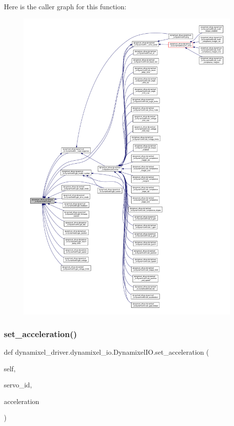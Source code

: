 Here is the caller graph for this function\+:
\nopagebreak
\begin{figure}[H]
\begin{center}
\leavevmode
\includegraphics[width=350pt]{dd/d77/classdynamixel__driver_1_1dynamixel__io_1_1_dynamixel_i_o_a6f8abf6563aac5aed93565234b971314_icgraph}
\end{center}
\end{figure}
\mbox{\label{classdynamixel__driver_1_1dynamixel__io_1_1_dynamixel_i_o_a493890484a67a377cb462c5ad58217e5}} 
\subsubsection{\texorpdfstring{set\+\_\+acceleration()}{set\_acceleration()}}
{\footnotesize\ttfamily def dynamixel\+\_\+driver.\+dynamixel\+\_\+io.\+Dynamixel\+I\+O.\+set\+\_\+acceleration (\begin{DoxyParamCaption}\item[{}]{self,  }\item[{}]{servo\+\_\+id,  }\item[{}]{acceleration }\end{DoxyParamCaption})}

